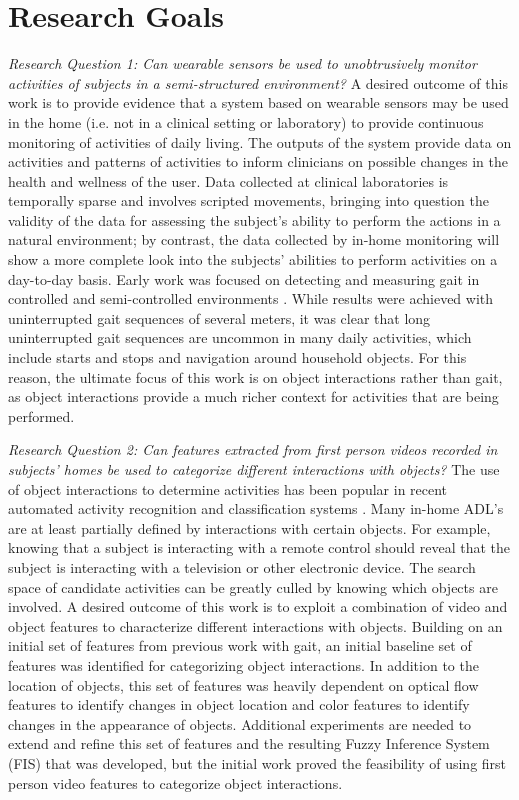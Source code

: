 \documentclass[12pt]{report}
\begin{document}
\section{Research Goals}
\emph{Research Question 1: Can wearable sensors be used to unobtrusively monitor activities of subjects in a semi-structured environment?}
A desired outcome of this work is to provide evidence that a system based on wearable sensors may be used in the home (i.e. not in a clinical setting or laboratory) to provide continuous monitoring of activities of daily living. The outputs of the system provide data on activities and patterns of activities to inform clinicians on possible changes in the health and wellness of the user. Data collected at clinical laboratories is temporally sparse and involves scripted movements, bringing into question the validity of the data for assessing the subject’s ability to perform the actions in a natural environment; by contrast, the data collected by in-home monitoring will show a more complete look into the subjects’ abilities to perform activities on a day-to-day basis.
Early work was focused on detecting and measuring gait in controlled and semi-controlled environments \cite{Schneider2017PreliminaryProcessing, Schneider2019ComparisonEnvironments}. While results were achieved with uninterrupted gait sequences of several meters, it was clear that long uninterrupted gait sequences are uncommon in many daily activities, which include starts and stops and navigation around household objects. For this reason, the ultimate focus of this work is on object interactions rather than gait, as object interactions provide a much richer context for activities that are being performed.

\emph{Research Question 2: Can features extracted from first person videos recorded in subjects’ homes be used to categorize different interactions with objects?}
The use of object interactions to determine activities has been popular in recent automated activity recognition and classification systems \cite{Pirsiavash2012, Sudhakaran2018, Nakatani2018PreliminaryKnowledge, Wang2018, Gokce2019HumanPairs}. Many in-home ADL’s are at least partially defined by interactions with certain objects. For example, knowing that a subject is interacting with a remote control should reveal that the subject is interacting with a television or other electronic device. The search space of candidate activities can be greatly culled by knowing which objects are involved. A desired outcome of this work is to exploit a combination of video and object features to characterize different interactions with objects.
Building on an initial set of features from previous work with gait, an initial baseline set of features was identified for categorizing object interactions. In addition to the location of objects, this set of features was heavily dependent on optical flow features to identify changes in object location and color features to identify changes in the appearance of objects. Additional experiments are needed to extend and refine this set of features and the resulting Fuzzy Inference System (FIS) that was developed, but the initial work proved the feasibility of using first person video features to categorize object interactions.
\end{document}
